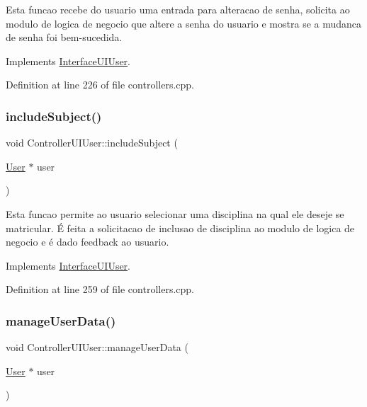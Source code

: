 Esta funcao recebe do usuario uma entrada para alteracao de senha, solicita ao modulo de logica de negocio que altere a senha do usuario e mostra se a mudanca de senha foi bem-\/sucedida. 

Implements \hyperlink{class_interface_u_i_user_a56170420b7ce8f3a69c1097aa4fb19d7}{Interface\+U\+I\+User}.



Definition at line 226 of file controllers.\+cpp.

\mbox{\label{class_controller_u_i_user_a9bf2ce224d3d3064542c89a287cb93ca}} 
\subsubsection{\texorpdfstring{include\+Subject()}{includeSubject()}}
{\footnotesize\ttfamily void Controller\+U\+I\+User\+::include\+Subject (\begin{DoxyParamCaption}\item[{\hyperlink{class_user}{User} $\ast$}]{user }\end{DoxyParamCaption})\hspace{0.3cm}{\ttfamily [virtual]}}

Esta funcao permite ao usuario selecionar uma disciplina na qual ele deseje se matricular. É feita a solicitacao de inclusao de disciplina ao modulo de logica de negocio e é dado feedback ao usuario. 

Implements \hyperlink{class_interface_u_i_user_a9e578488a9effc0f41f4ac034b6744cf}{Interface\+U\+I\+User}.



Definition at line 259 of file controllers.\+cpp.

\mbox{\label{class_controller_u_i_user_a3d496ebc4d35be9d001c543ccc605341}} 
\subsubsection{\texorpdfstring{manage\+User\+Data()}{manageUserData()}}
{\footnotesize\ttfamily void Controller\+U\+I\+User\+::manage\+User\+Data (\begin{DoxyParamCaption}\item[{\hyperlink{class_user}{User} $\ast$}]{user }\end{DoxyParamCaption})\hspace{0.3cm}{\ttfamily [virtual]}}

